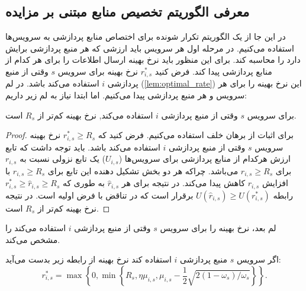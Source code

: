     \subsection{معرفی الگوریتم تخصیص منابع مبتنی بر مزایده}
      در این جا از یک الگوریتم تکرار شونده برای اختصاص منابع پردازشی به سرویس‌ها استفاده می‌کنیم.
      در مرحله اول هر سرویس باید ارزشی که هر منبع پردازشی برایش دارد را محاسبه کند.
      برای این منظور باید نرخ بهینه ارسال اطلاعات را برای هر کدام از منابع پردازشی پیدا کند.
      فرض کنید $r_{i,s}^*$ نرخ بهینه برای سرویس $s$ وقتی از منبع پردازشی $i$ استفاده می‌کند باشد.
      در لم (\ref{lem:optimal_rate}) این نرخ بهینه را برای هر سرویس و هر منبع پردازشی پیدا می‌کنیم.
      اما ابتدا نیاز به لم زیر داریم:
      \begin{lemma}\label{lem:optimal_rate_positive}
        برای سرویس $s$ وقتی از منبع پردازشی $i$ استفاده می‌کند, نرخ بهینه کم‌تر از $R_s$ است.
      \end{lemma}
      \begin{proof}
        برای اثبات از برهان خلف استفاده می‌کنیم.
        فرض کنید که $r_{i,s}^* \ge R_s$ نرخ بهینه سرویس $s$ وقتی از منبع پردازشی $i$ استفاده می‌کند باشد.
        باید توجه داشت که تابع ارزش هرکدام از منابع پردازشی برای سرویس‌ها ($U_{i,s}$) یک تابع نزولی نسبت به $r_{i,s}$ برای $r_{i,s} \ge R_s$ می‌باشد.
        چراکه هر دو بخش تشکیل دهنده این تابع برای $r_{i,s} \ge R_s$ با افزایش $r_{i,s}$ کاهش پیدا می‌کند.
        در نتیجه برای هر $\hat{r}_{i,s}$ به طوری که $r_{i,s}^* \ge \hat{r}_{i,s} \ge R_s$ رابطه $U(\hat{r}_{i,s}) \ge U(r_{i,s}^*)$ برقرار است که در تناقض با فرض اولیه است.
        در نتیجه نرخ بهینه کم‌تر از $R_s$ است.
      \end{proof}
      لم بعد، نرخ بهینه را برای سرویس $s$ وقتی از منبع پردازشی $i$ استفاده می‌کند را مشخص می‌کند.
      \begin{lemma}\label{lem:optimal_rate}
        اگر سرویس $s$ منبع پردازشی $i$ استفاده کند نرخ بهینه از رابطه زیر بدست می‌آید:
        \begin{equation}\label{eqn:optimal_rate}
          r_{i,s}^* = \max\left\{0,\min\left\{R_s, \eta \mu_{i,s}, \mu_{i,s}-\frac{1}{2}\sqrt{2(1-\omega_s)/\omega_s}\right\}\right\}.
        \end{equation}
      \end{lemma}
